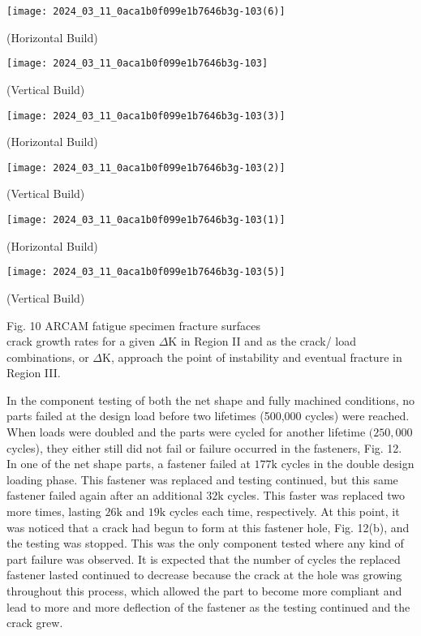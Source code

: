 \documentclass[10pt]{article}
\begin{document}
\begin{center}
\texttt{[image: 2024\_03\_11\_0aca1b0f099e1b7646b3g-103(6)]}
\end{center}

(Horizontal Build)

\begin{center}
\texttt{[image: 2024\_03\_11\_0aca1b0f099e1b7646b3g-103]}
\end{center}

(Vertical Build)

\begin{center}
\texttt{[image: 2024\_03\_11\_0aca1b0f099e1b7646b3g-103(3)]}
\end{center}

(Horizontal Build)

\begin{center}
\texttt{[image: 2024\_03\_11\_0aca1b0f099e1b7646b3g-103(2)]}
\end{center}

(Vertical Build)

\begin{center}
\texttt{[image: 2024\_03\_11\_0aca1b0f099e1b7646b3g-103(1)]}
\end{center}

(Horizontal Build)

\begin{center}
\texttt{[image: 2024\_03\_11\_0aca1b0f099e1b7646b3g-103(5)]}
\end{center}

(Vertical Build)

Fig. 10 ARCAM fatigue specimen fracture surfaces\\
crack growth rates for a given $\Delta \mathrm{K}$ in Region II and as the crack/ load combinations, or $\Delta \mathrm{K}$, approach the point of instability and eventual fracture in Region III.

In the component testing of both the net shape and fully machined conditions, no parts failed at the design load before two lifetimes (500,000 cycles) were reached. When loads were doubled and the parts were cycled for another lifetime $(250,000$ cycles), they either still did not fail or failure occurred in the fasteners, Fig. 12. In one of the net shape parts, a fastener failed at $177 \mathrm{k}$ cycles in the double design loading phase. This fastener was replaced and testing continued, but this same fastener failed again after an additional $32 \mathrm{k}$ cycles. This faster was replaced two more times, lasting $26 \mathrm{k}$ and $19 \mathrm{k}$ cycles each time, respectively. At this point, it was noticed that a crack had begun to form at this fastener hole, Fig. 12(b), and the testing was stopped. This was the only component tested where any kind of part failure was observed. It is expected that the number of cycles the replaced fastener lasted continued to decrease because the crack at the hole was growing throughout this process, which allowed the part to become more compliant and lead to more and more deflection of the fastener as the testing continued and the crack grew.
\end{document}
